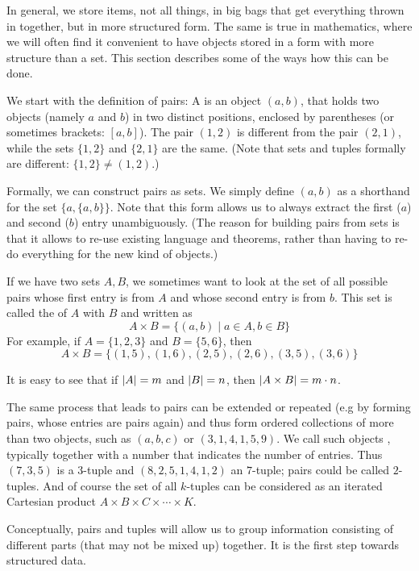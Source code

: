 In general, we store items, not all things, in big bags that get everything thrown in
together, but in more structured form. The same is true in mathematics,
where we will often find it convenient to have objects stored in a form with
more structure than a set. This section describes some of the ways how this
can be done.

We start with the definition of pairs: A  is an object $(a,b)$,
that holds two objects (namely $a$ and $b$) in two distinct positions,
enclosed by parentheses (or sometimes brackets: $[a,b]$). The
pair $(1,2)$ is different from the pair $(2,1)$, while the sets $\{1,2\}$
and $\{2,1\}$ are the same. (Note that sets and tuples formally are
different: $\{1,2\}\not=(1,2)$.)

Formally, we can construct pairs as sets. We simply define $(a,b)$ as a
shorthand for the set $\{a,\{a,b\}\}$. Note that this form allows us to
always extract the first ($a$) and second ($b$) entry unambiguously. (The
reason for building pairs from sets is that it allows to re-use existing
language and theorems, rather than having to re-do everything for the new
kind of objects.)
\medskip

If we have two sets $A,B$, we sometimes want to look at the set of all
possible pairs whose first entry is from $A$ and whose second entry is from
$b$.
This set is called the 
of $A$ with
$B$ and written as
\[
A\times B=\{(a,b)\mid a\in A,b\in B\}
\]
For example, if $A=\{1,2,3\}$ and $B=\{5,6\}$, then
\[
A\times B=\{(1,5),(1,6),(2,5),(2,6),(3,5),(3,6)\}
\]

It is easy to see that if $\left|A\right|=m$ and $\left|B\right|=n$, then $\left|A\times
B\right|=m\cdot n$.
\medskip

The same process that leads to pairs can be extended or repeated (e.g by
forming pairs, whose entries are pairs again) and thus form ordered
collections of more than two objects, such as $(a,b,c)$ or $(3,1,4,1,5,9)$.
We call such objects ,
typically together with a number that
indicates the number of entries.
Thus $(7,3,5)$ is a $3$-tuple and $(8,2,5,1,4,1,2)$ an $7$-tuple; pairs
could be called $2$-tuples. 
And of course the set of all $k$-tuples can be considered as an iterated
Cartesian product $A\times B\times C\times\cdots\times K$.
\medskip

Conceptually, pairs and tuples will allow us to group information consisting
of different parts (that may not be mixed up) together. It is the first step
towards structured data.

